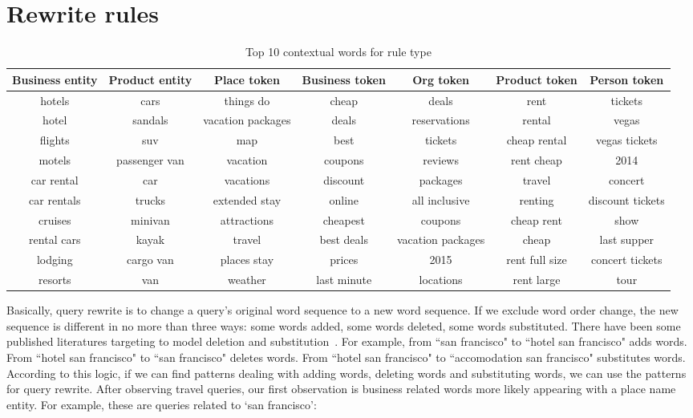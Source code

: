 \documentclass{sig-alternate}
\begin{document}
\section{Rewrite rules}
\begin{table*}
\caption{Top 10 contextual words for rule type}
\label{table:examples}
\begin{tabular}{|c|c|c|c|c|c|c|} \hline 
  Business entity & Product entity & Place token & Business token & Org token & Product token & Person token \\ \hline \hline
 hotels & cars & things do & cheap & deals & rent & tickets \\
hotel &   sandals & vacation packages &deals&reservations&rental&vegas  \\
flights & suv & map &best&tickets&cheap rental&vegas tickets \\
motels & passenger van &vacation&coupons&reviews&rent cheap&2014 \\
car rental & car &vacations&discount&packages&travel&concert \\
 car rentals    & trucks &extended stay&online&all inclusive&renting&discount tickets\\
  cruises            & minivan &attractions &cheapest&coupons&cheap rent&show	\\
   rental cars   &kayak &travel &best deals&vacation packages&cheap&last supper\\
  lodging       &cargo van&places stay&prices&2015&rent full size&concert tickets\\
      resorts  & van &weather&last minute&locations&rent large&tour \\ \hline
\end{tabular}
\end{table*}


Basically, query rewrite is to change a query's original word sequence to a new word sequence. If we exclude word order change, the new sequence is different in no more than  three ways: some words added, some words deleted, some words substituted.  There have been some published literatures targeting to model deletion and substitution~\cite{Rosie:2003,Rosie:2007}. For example, from ``san francisco" to ``hotel san francisco"  adds words. From ``hotel san francisco" to ``san francisco"  deletes words. From ``hotel san francisco" to ``accomodation san francisco"  substitutes words. According to this logic, if we can find patterns dealing with adding words, deleting words and substituting words, we can use the patterns for query rewrite. After observing travel queries, our first observation is business related words more likely appearing with a place name entity. For example,  these are queries related to `san francisco':
\end{document}
